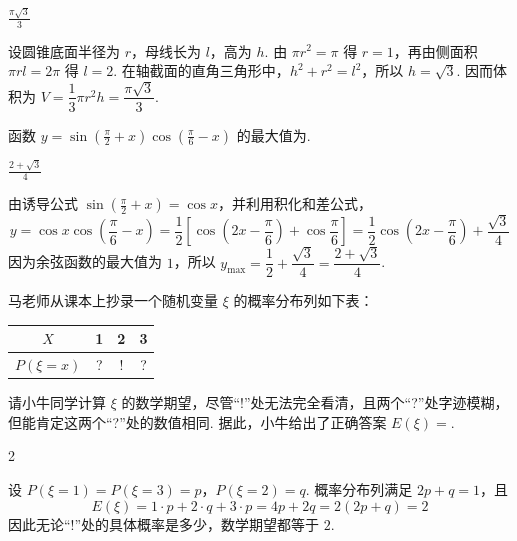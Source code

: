 \begin{answer}
\(\frac{\pi\sqrt{3}}{3}\)
\end{answer}

\begin{solution}
设圆锥底面半径为 \(r\)，母线长为 \(l\)，高为 \(h\). 由 \(\pi r^2=\pi\) 得 \(r=1\)，再由侧面积 \(\pi rl=2\pi\) 得 \(l=2\). 在轴截面的直角三角形中，\(h^2+r^2=l^2\)，所以 \(h=\sqrt3\). 因而体积为 \(V=\dfrac13\pi r^2h=\dfrac{\pi\sqrt3}{3}\).
\end{solution}

\begin{problem}
函数 \( y = \sin \left(\frac{\pi}{2} + x\right) \cos \left(\frac{\pi}{6} - x\right) \) 的最大值为\fillinblank{}.
\end{problem}

\begin{answer}
\(\frac{2+\sqrt{3}}{4}\)
\end{answer}

\begin{solution}
由诱导公式 \(\sin(\frac\pi2+x)=\cos x\)，并利用积化和差公式，
\[
y=\cos x\cos\left(\frac\pi6-x\right)=\frac12\left[\cos\left(2x-\frac\pi6\right)+\cos\frac\pi6\right]
=\frac12\cos\left(2x-\frac\pi6\right)+\frac{\sqrt3}{4}
\]
因为余弦函数的最大值为 \(1\)，所以 \(y_{\max}=\dfrac12+\dfrac{\sqrt3}{4}=\dfrac{2+\sqrt3}{4}\).
\end{solution}

\begin{problem}
马老师从课本上抄录一个随机变量 \(\xi\) 的概率分布列如下表：

\begin{center}
\begin{tabular}{|c|c|c|c|}
\hline
\(X\) & 1 & 2 & 3 \\
\hline
\(P(\xi=x)\) & ? & ! & ? \\
\hline
\end{tabular}
\end{center}

请小牛同学计算 \( \xi \) 的数学期望，尽管“!”处无法完全看清，且两个“?”处字迹模糊，但能肯定这两个“?”处的数值相同. 据此，小牛给出了正确答案 \(E(\xi)=\)\fillinblank{}.
\end{problem}

\begin{answer}
2
\end{answer}

\begin{solution}
设 \(P(\xi=1)=P(\xi=3)=p\)，\(P(\xi=2)=q\). 概率分布列满足 \(2p+q=1\)，且
\[
E(\xi)=1\cdot p+2\cdot q+3\cdot p=4p+2q=2(2p+q)=2
\]
因此无论“!”处的具体概率是多少，数学期望都等于 \(2\).
\end{solution}


